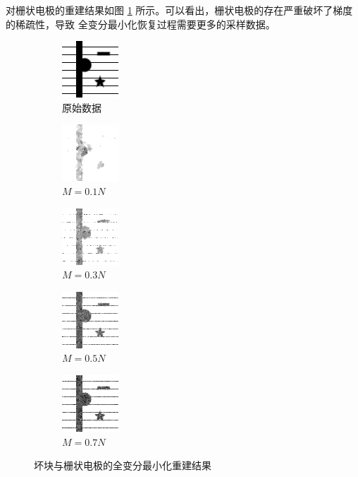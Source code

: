 对栅状电极的重建结果如图 \ref{fig:TVfinger}
所示。可以看出，栅状电极的存在严重破坏了梯度的稀疏性，导致
全变分最小化恢复过程需要更多的采样数据。

\begin{figure}
\centering
\begin{subfigure}[t]{1.1in}
	\includegraphics{Figure/testdata/2dsharp_finger.png}
	\caption{原始数据}
\end{subfigure}
\begin{subfigure}[t]{1.1in}
	\includegraphics{Figure/TV/finger10.png}
	\caption{$M = 0.1 N$}
\end{subfigure}
\begin{subfigure}[t]{1.1in}
	\includegraphics{Figure/TV/finger30.png}
	\caption{$M = 0.3 N$}
\end{subfigure}
\begin{subfigure}[t]{1.1in}
	\includegraphics{Figure/TV/finger50.png}
	\caption{$M = 0.5 N$}
\end{subfigure}
\begin{subfigure}[t]{1.1in}
	\includegraphics{Figure/TV/finger70.png}
	\caption{$M = 0.7 N$}
\end{subfigure}
\caption{坏块与栅状电极的全变分最小化重建结果}
\label{fig:TVfinger}
\end{figure}

